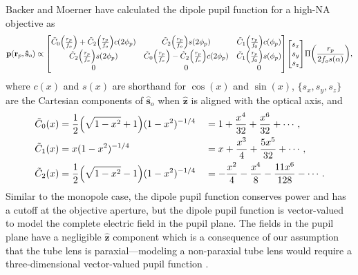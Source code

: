 \documentclass[]{osa-article}
\let\originalleft\left
\let\originalright\right
\renewcommand{\left}{\mathopen{}\mathclose\bgroup\originalleft}
\renewcommand{\right}{\aftergroup\egroup\originalright}
\providecommand{\mb}[1]{\mathbf{#1}}
\providecommand{\so}{\mathbf{\hat{s}}_o}
\providecommand{\rp}{\mathbf{r}_p}
\providecommand{\mh}[1]{\mathbf{\hat{#1}}}
\begin{document}
 Backer and Moerner \cite{backer2014} have calculated the dipole pupil function
 for a high-NA objective as
 \begin{align}
   \mb{p}(\rp, \so) \propto
   \begin{bmatrix}
     \tilde{C}_0\left(\frac{r_p}{f_o}\right) + \tilde{C}_2\left(\frac{r_p}{f_o}\right)c(2\phi_p)&\tilde{C}_2\left(\frac{r_p}{f_o}\right)s(2\phi_p)&\tilde{C}_1\left(\frac{r_p}{f_0}\right)c(\phi_p)\\
     \tilde{C}_2\left(\frac{r_p}{f_o}\right)s(2\phi_p)&\tilde{C}_0\left(\frac{r_p}{f_o}\right) - \tilde{C}_2\left(\frac{r_p}{f_o}\right)c(2\phi_p)&\tilde{C}_1\left(\frac{r_p}{f_0}\right)s(\phi_p)\\     
     0&0&0\\     
   \end{bmatrix}
   \begin{bmatrix}
     s_x\\
     s_y\\
     s_z
   \end{bmatrix}
   \Pi\left(\frac{r_p}{2f_os(\alpha)}\right),
 \end{align}
 where $c(x)$ and $s(x)$ are shorthand for $\cos(x)$ and $\sin(x)$,
 $\{s_x, s_y, s_z\}$ are the Cartesian components of $\so$ when $\mh{z}$ is
 aligned with the optical axis, and
 \begin{alignat}{4}
   \tilde{C}_0(x) &= \frac{1}{2}\left(\sqrt{1 - x^2} + 1\right)(1 - x^2)^{-1/4} &&= 1 + \frac{x^4}{32} + \frac{x^6}{32} + \cdots,\\
   \tilde{C}_1(x) &= x(1 - x^2)^{-1/4} &&= x + \frac{x^3}{4} + \frac{5x^5}{32} + \cdots,\\
   \tilde{C}_2(x) &= \frac{1}{2}\left(\sqrt{1 - x^2} - 1\right)(1 - x^2)^{-1/4} &&= -\frac{x^2}{4} - \frac{x^4}{8} - \frac{11x^6}{128} - \cdots.
 \end{alignat}
 Similar to the monopole case, the dipole pupil function conserves power and has
 a cutoff at the objective aperture, but the dipole pupil function is
 vector-valued to model the complete electric field in the pupil plane. The
 fields in the pupil plane have a negligible $\mh{z}$ component which is a
 consequence of our assumption that the tube lens is paraxial---modeling a
 non-paraxial tube lens would require a three-dimensional vector-valued pupil
 function \cite{sheppard1994, gu2000, arnison2002, foreman2011-2}. 
\end{document}
